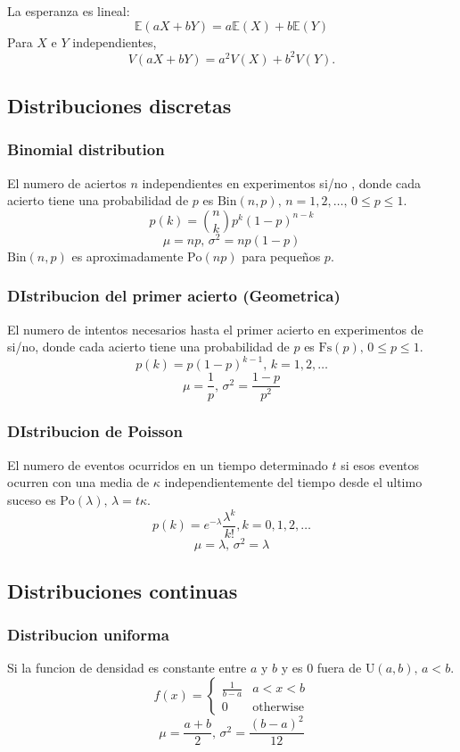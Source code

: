 La esperanza es lineal:
\[\mathbb{E}(aX+bY) = a\mathbb{E}(X)+b\mathbb{E}(Y)\]
Para $X$ e $Y$ independientes, \[V(aX+bY) = a^2V(X)+b^2V(Y).\]

\subsection{Distribuciones discretas}

\subsubsection{Binomial distribution}
El numero de aciertos $n$ independientes en experimentos si/no , donde cada acierto tiene una probabilidad de $p$ es $\textrm{Bin}(n,p),\,n=1,2,\dots,\, 0\leq p\leq1$.
\[p(k)=\binom{n}{k}p^k(1-p)^{n-k}\]
\[\mu = np,\,\sigma^2=np(1-p)\]
$\textrm{Bin}(n,p)$ es aproximadamente $\textrm{Po}(np)$ para pequeños $p$.

\subsubsection{DIstribucion del primer acierto (Geometrica)}
El numero de intentos necesarios hasta el primer acierto en experimentos de si/no, donde cada acierto tiene una probabilidad de $p$ es $\textrm{Fs}(p),\,0\leq p\leq1$.
\[p(k)=p(1-p)^{k-1},\,k=1,2,\dots\]
\[\mu = \frac1p,\,\sigma^2=\frac{1-p}{p^2}\]

\subsubsection{DIstribucion de Poisson}
El numero de eventos ocurridos en un tiempo determinado $t$ si esos eventos ocurren con una media de $\kappa$ independientemente del tiempo desde el ultimo suceso es $\textrm{Po}(\lambda),\,\lambda=t\kappa$.
\[p(k)=e^{-\lambda}\frac{\lambda^k}{k!}, k=0,1,2,\dots\]
\[\mu=\lambda,\,\sigma^2=\lambda\]

\subsection{Distribuciones continuas}

\subsubsection{Distribucion uniforma}
Si la funcion de densidad es constante entre $a$ y $b$ y es 0 fuera de  $\textrm{U}(a,b),\,a<b$.
\[f(x) = \left\{
\begin{array}{cl}
\frac{1}{b-a} & a<x<b\\
0 & \textrm{otherwise}
\end{array}\right.\]
\[\mu=\frac{a+b}{2},\,\sigma^2=\frac{(b-a)^2}{12}\]


